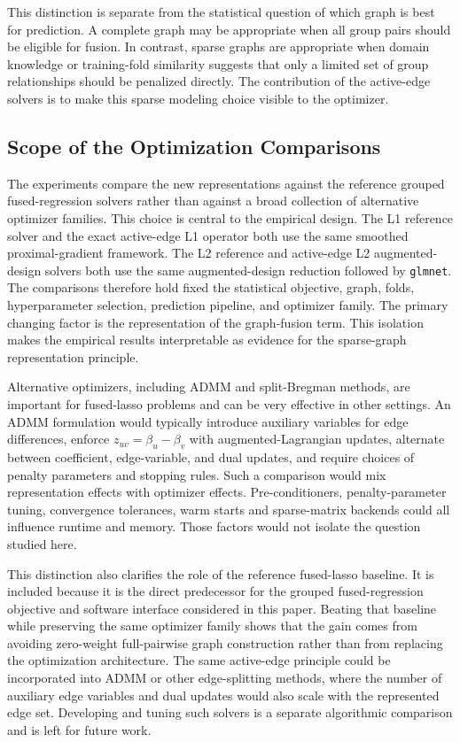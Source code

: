 \documentclass[twoside,11pt]{article}
\begin{document}
This distinction is separate from the statistical question of which graph is best for prediction. 
A complete graph may be appropriate when all group pairs should be eligible for fusion. 
In contrast, sparse graphs are appropriate when domain knowledge or training-fold similarity suggests that only a limited set of group relationships should be penalized directly. 
The contribution of the active-edge solvers is to make this sparse modeling choice visible to the
optimizer. 


\subsection{Scope of the Optimization Comparisons}
The experiments compare the new representations against the reference grouped fused-regression solvers rather than against a broad collection of alternative optimizer families. 
This choice is central to the empirical design. 
The L1 reference solver and the exact active-edge L1 operator both use the same smoothed proximal-gradient framework. 
The L2 reference and active-edge L2 augmented-design solvers both use the same augmented-design reduction followed by \texttt{glmnet}. 
The comparisons therefore hold fixed the statistical objective, graph, folds, hyperparameter selection, prediction pipeline, and optimizer family. 
The primary changing factor is the representation of the graph-fusion term. 
This isolation makes the empirical results interpretable as evidence for the sparse-graph representation principle.

Alternative optimizers, including ADMM and split-Bregman methods, are important for fused-lasso problems and can be very effective in other settings. 
An ADMM formulation would typically introduce auxiliary variables for edge differences, enforce $z_{uv}=\beta_u-\beta_v$ with augmented-Lagrangian updates, alternate between coefficient, edge-variable, and dual updates, and require choices of penalty parameters and stopping rules. 
Such a comparison would mix representation effects with optimizer effects. 
Pre-conditioners, penalty-parameter tuning, convergence tolerances, warm starts and sparse-matrix backends could all influence runtime and memory.
Those factors would not isolate the question studied here.

This distinction also clarifies the role of the reference fused-lasso baseline.
It is included because it is the direct predecessor for the grouped fused-regression objective and software interface considered in this paper. 
Beating that baseline while preserving the same optimizer family shows that the gain comes from avoiding zero-weight full-pairwise graph construction rather than from replacing the optimization architecture. 
The same active-edge principle could be incorporated into ADMM or other edge-splitting methods, where the number of auxiliary edge variables and dual updates would also scale with the represented edge set. 
Developing and tuning such solvers is a separate algorithmic comparison and is left for future work.
\end{document}
